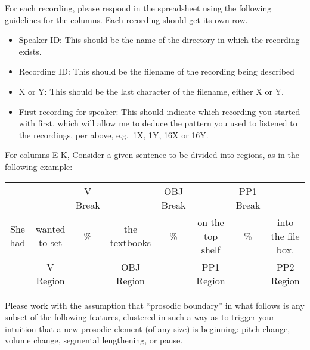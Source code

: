 \documentclass[11pt,oneside]{book}
\providecommand{\tightlist}{%
  \setlength{\itemsep}{0pt}\setlength{\parskip}{0pt}}
\begin{document}
For each recording, please respond in the spreadsheet using the following guidelines for the columns. Each recording should get its own row.

\begin{itemize}
\tightlist
\item
  Speaker ID: This should be the name of the directory in which the recording exists.
\item
  Recording ID: This should be the filename of the recording being described
\item
  X or Y: This should be the last character of the filename, either X or Y.
\item
  First recording for speaker: This should indicate which recording you started with first, which will allow me to deduce the pattern you used to listened to the recordings, per above, e.g.~1X, 1Y, 16X or 16Y.
\end{itemize}

For columns E-K, Consider a given sentence to be divided into regions, as in the following example:

\vspace{2cm}
\begingroup
  \setlength{\tabcolsep}{1pt}
  \begin{tabular}{cccccccc}
    & & \footnotesize V Break & & \footnotesize OBJ Break & & \footnotesize PP1 Break & \\
    She had & wanted to set & \% & the textbooks & \% & on the top shelf & \% & into the file box. \\
    \cmidrule(r){2-2} \cmidrule(r){4-4} \cmidrule(r){6-6} \cmidrule(r){8-8} 
    & \footnotesize V Region & & \footnotesize OBJ Region & & \footnotesize PP1 Region & & PP2 Region \\
  \end{tabular}
\endgroup
\vspace{1cm}

Please work with the assumption that ``prosodic boundary'' in what follows is any subset of the following features, clustered in such a way as to trigger your intuition that a new prosodic element (of any size) is beginning: pitch change, volume change, segmental lengthening, or pause.
\end{document}
